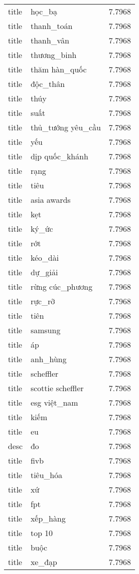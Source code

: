 \documentclass{article}
\begin{document}
\begin{tabular}{lll}
title & học\_bạ & 7.7968\\
title & thanh\_toán & 7.7968\\
title & thanh\_vân & 7.7968\\
title & thương\_binh & 7.7968\\
title & thăm hàn\_quốc & 7.7968\\
title & độc\_thân & 7.7968\\
title & thúy & 7.7968\\
title & suất & 7.7968\\
title & thủ\_tướng yêu\_cầu & 7.7968\\
title & yếu & 7.7968\\
title & dịp quốc\_khánh & 7.7968\\
title & rạng & 7.7968\\
title & tiêu & 7.7968\\
title & asia awards & 7.7968\\
title & kẹt & 7.7968\\
title & ký\_ức & 7.7968\\
title & rớt & 7.7968\\
title & kéo\_dài & 7.7968\\
title & dự\_giải & 7.7968\\
title & rừng cúc\_phương & 7.7968\\
title & rực\_rỡ & 7.7968\\
title & tiên & 7.7968\\
title & samsung & 7.7968\\
title & áp & 7.7968\\
title & anh\_hùng & 7.7968\\
title & scheffler & 7.7968\\
title & scottie scheffler & 7.7968\\
title & esg việt\_nam & 7.7968\\
title & kiếm & 7.7968\\
title & eu & 7.7968\\
desc & đo & 7.7968\\
title & fivb & 7.7968\\
title & tiêu\_hóa & 7.7968\\
title & xứ & 7.7968\\
title & fpt & 7.7968\\
title & xếp\_hàng & 7.7968\\
title & top 10 & 7.7968\\
title & buộc & 7.7968\\
title & xe\_đạp & 7.7968\\

\end{tabular}
\end{document}
